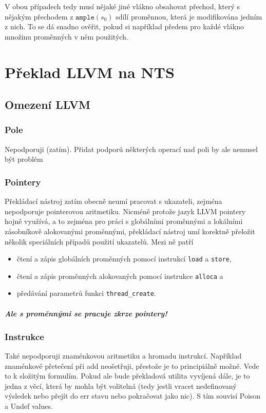 \documentclass[10pt,a4paper,notitlepage]{report}
\begin{document}
V obou případech tedy musí nějaké jiné vlákno obsahovat přechod, který s nějakým přechodem z $\texttt{ample}(s_0)$ sdílí proměnnou, která je modifikována jedním z nich. To se dá snadno ověřit, pokud si například předem pro každé vlákno množinu proměnných v něm použitých.



\chapter{Překlad LLVM na NTS}
\section{Omezení LLVM}

\subsection{Pole}
Nepodporuji (zatím). Přidat podporů některých operací nad poli by ale nemusel být problém

\subsection{Pointery}
Překládací nástroj zatím obecně neumí pracovat s ukazateli, zejména nepodporuje pointerovou aritmetiku. Nicméně protože jazyk LLVM pointery hojně využívá, a to zejména pro práci s globálními proměnnými a lokálními zásobníkově alokovanými proměnnými, překládací nástroj umí korektně přeložit několik speciálních případů použití ukazatelů. Mezi ně patří
\begin{itemize}
\item čtení a zápis globálních proměnných pomocí instrukcí \texttt{load} a \texttt{store},
\item čtení a zápis proměnných alokovaných pomocí instrukce \texttt{alloca} a
\item předávání parametrů funkci \texttt{thread\_create}.
\end{itemize}
\paragraph{Ale s proměnnými se pracuje zkrze pointery!}

\subsection{Instrukce}
Také nepodporuji znaménkovou aritmetiku a hromadu instrukcí. Například znaménkové přetečení při add neošetřuji, přestože je to principiálně možné. Vede to k složitým formulím. Pokud ale bude překladová utilita vyvíjená dále, je to jedna z věcí, která by mohla být volitelná (tedy jestli vracet nedefinovaný výsledek nebo přejít do err stavu nebo pokračovat jako nic). S tím souvisí Poison a Undef values.
\end{document}
